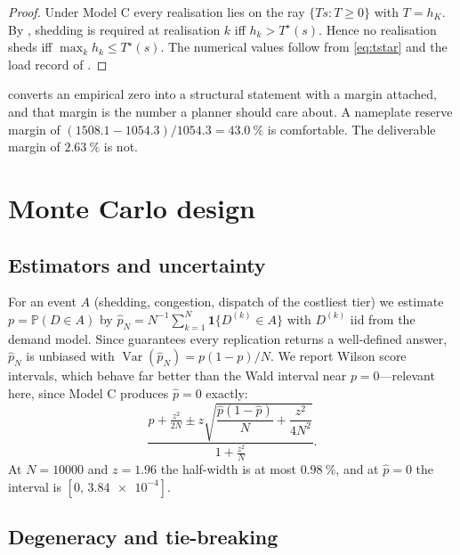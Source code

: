 \documentclass[11pt,a4paper]{article}
\theoremstyle{definition}
\theoremstyle{plain}
\theoremstyle{remark}
\newcommand{\Prob}{\mathbb{P}}
\newcommand{\Var}{\operatorname{Var}}
\begin{document}
\begin{proof}
Under Model C every realisation lies on the ray $\{T s : T \ge 0\}$ with
$T = h_K$. By , shedding is required at realisation $k$ iff
$h_k > T^\star(s)$. Hence no realisation sheds iff
$\max_k h_k \le T^\star(s)$. The numerical values follow from
\eqref{eq:tstar} and the load record of .
\end{proof}

 converts an empirical zero into a structural statement with a
margin attached, and that margin is the number a planner should care about. A
nameplate reserve margin of $(\num{1508.1}-\num{1054.3})/\num{1054.3} =
\SI{43.0}{\percent}$ is comfortable. The deliverable margin of
$\SI{2.63}{\percent}$ is not.

\section{Monte Carlo design}\label{sec:mc}

\subsection{Estimators and uncertainty}

For an event $A$ (shedding, congestion, dispatch of the costliest tier) we
estimate $p = \Prob(D \in A)$ by
$\hat p_N = N^{-1}\sum_{k=1}^N \mathbf{1}\{D^{(k)} \in A\}$ with
$D^{(k)}$ iid from the demand model. Since  guarantees every
replication returns a well-defined answer, $\hat p_N$ is unbiased with
$\Var(\hat p_N) = p(1-p)/N$. We report Wilson score intervals, which behave far
better than the Wald interval near $p = 0$---relevant here, since Model C
produces $\hat p = 0$ exactly:
\begin{equation}\label{eq:wilson}
\frac{\hat p + \frac{z^2}{2N} \pm z\sqrt{\dfrac{\hat p(1-\hat p)}{N} + \dfrac{z^2}{4N^2}}}
     {1 + \frac{z^2}{N}} .
\end{equation}
At $N = \num{10000}$ and $z = 1.96$ the half-width is at most
$\SI{0.98}{\percent}$, and at $\hat p = 0$ the interval is
$[0,\, \num{3.84e-4}]$.

\subsection{Degeneracy and tie-breaking}
\end{document}
